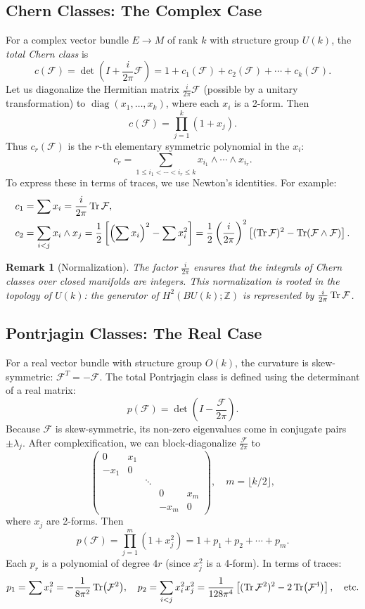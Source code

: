 \documentclass[11pt]{article}
\newcommand{\diag}{\operatorname{diag}}%
\newcommand{\cF}{\mathcal{F}}
\newcommand{\Z}{\mathbb{Z}}
\newtheorem{remark}[theorem]{Remark}
\begin{document}
\subsection{Chern Classes: The Complex Case}
For a complex vector bundle \(E\to M\) of rank \(k\) with structure group \(U(k)\), the \emph{total Chern class} is
\[
c(\cF) = \det\!\left(I + \frac{i}{2\pi}\cF\right) = 1 + c_1(\cF) + c_2(\cF) + \cdots + c_k(\cF).
\]
Let us diagonalize the Hermitian matrix \(\frac{i}{2\pi}\cF\) (possible by a unitary transformation) to \(\diag(x_1,\dots,x_k)\), where each \(x_i\) is a 2-form. Then
\[
c(\cF) = \prod_{j=1}^k (1+x_j).
\]
Thus \(c_r(\cF)\) is the \(r\)-th elementary symmetric polynomial in the \(x_i\):
\[
c_r = \sum_{1\le i_1<\cdots<i_r\le k} x_{i_1}\wedge\cdots\wedge x_{i_r}.
\]
To express these in terms of traces, we use Newton's identities. For example:
\begin{align*}
c_1 &= \sum x_i = \frac{i}{2\pi}\Tr\cF,\\
c_2 &= \sum_{i<j} x_i\wedge x_j = \frac{1}{2}\left[\left(\sum x_i\right)^2 - \sum x_i^2\right] 
      = \frac{1}{2}\left(\frac{i}{2\pi}\right)^2 \left[(\Tr\cF)^2 - \Tr(\cF\wedge\cF)\right].
\end{align*}

\begin{remark}[Normalization]
The factor \(\frac{i}{2\pi}\) ensures that the integrals of Chern classes over closed manifolds are integers. This normalization is rooted in the topology of \(U(k)\): the generator of \(H^2(BU(k);\Z)\) is represented by \(\frac{i}{2\pi}\Tr\cF\).
\end{remark}

\subsection{Pontrjagin Classes: The Real Case}
For a real vector bundle with structure group \(O(k)\), the curvature is skew-symmetric: \(\cF^T = -\cF\). The total Pontrjagin class is defined using the determinant of a real matrix:
\[
p(\cF) = \det\!\left(I - \frac{\cF}{2\pi}\right).
\]
Because \(\cF\) is skew-symmetric, its non-zero eigenvalues come in conjugate pairs \(\pm \lambda_j\). After complexification, we can block-diagonalize \(\frac{\cF}{2\pi}\) to
\[
\begin{pmatrix}
0 & x_1 & & \\
-x_1 & 0 & & \\
& & \ddots & \\
& & & 0 & x_m \\
& & & -x_m & 0
\end{pmatrix}, \quad m = \lfloor k/2\rfloor,
\]
where \(x_j\) are 2-forms. Then
\[
p(\cF) = \prod_{j=1}^m (1+x_j^2) = 1 + p_1 + p_2 + \cdots + p_m.
\]
Each \(p_r\) is a polynomial of degree \(4r\) (since \(x_j^2\) is a 4-form). In terms of traces:
\[
p_1 = \sum x_i^2 = -\frac{1}{8\pi^2}\Tr(\cF^2), \quad
p_2 = \sum_{i<j} x_i^2 x_j^2 = \frac{1}{128\pi^4}\left[(\Tr\cF^2)^2 - 2\Tr(\cF^4)\right], \quad \text{etc.}
\]
\end{document}
